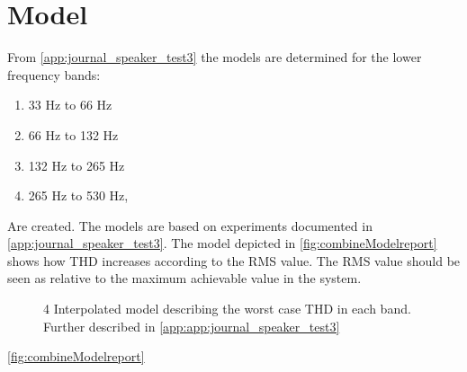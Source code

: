 \section{Model}

From \autoref{app:journal_speaker_test3} the models are determined for the lower frequency bands:
\begin{enumerate}
\item 33 Hz to 66 Hz
\item 66 Hz to 132 Hz
\item 132 Hz to 265 Hz
\item 265 Hz to 530 Hz,
\end{enumerate}
Are created. The models are based on experiments documented in \autoref{app:journal_speaker_test3}. The model depicted in \autoref{fig:combineModelreport} shows how THD increases according to the RMS value. The RMS value should be seen as relative to the maximum achievable value in the system. 

\begin{figure}[H]
    \centering
    
    \caption{4 Interpolated model describing the worst case THD in each band. Further described in \autoref{app:app:journal_speaker_test3}}
    \label{fig:CombinedModelreport}
\end{figure}

\autoref{fig:combineModelreport}